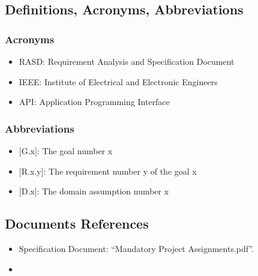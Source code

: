 \subsection{Definitions, Acronyms, Abbreviations}

\subsubsection{Acronyms}
\renewcommand{\labelitemi}{$-$}
\begin{itemize}
\item
RASD: Requirement Analysis and Specification Document
\item
IEEE: Institute of Electrical and Electronic Engineers
\item
API: Application Programming Interface
\end{itemize}

\subsubsection{Abbreviations}
\renewcommand{\labelitemi}{$-$}
\begin{itemize}
\item
$[$G.x$]$: The goal number x
\item
$[$R.x.y$]$: The requirement number y of the goal x
\item
$[$D.x$]$: The domain assumption number x
\end{itemize}

\subsection{Documents References}
\renewcommand{\labelitemi}{$-$}
\begin{itemize}
\item
Specification Document: “Mandatory Project Assignments.pdf”.
\item
\href{http://ieeexplore.ieee.org/servlet/opac?punumber=6146377}{\color{Black}{IEEE Std 29148-2011 - ISO/IEC/IEEE International Standard - Systems and software engineering}}
\end{itemize}